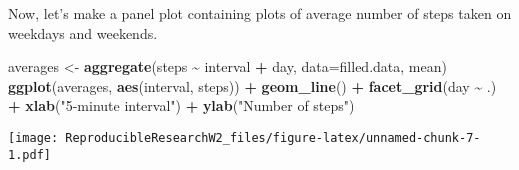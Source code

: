 \documentclass[
]{article}
\newenvironment{Shaded}{\begin{snugshade}}{\end{snugshade}}
\newcommand{\AttributeTok}[1]{\textcolor[rgb]{0.13,0.29,0.53}{#1}}
\newcommand{\FunctionTok}[1]{\textcolor[rgb]{0.13,0.29,0.53}{\textbf{#1}}}
\newcommand{\NormalTok}[1]{#1}
\newcommand{\OtherTok}[1]{\textcolor[rgb]{0.56,0.35,0.01}{#1}}
\newcommand{\SpecialCharTok}[1]{\textcolor[rgb]{0.81,0.36,0.00}{\textbf{#1}}}
\newcommand{\StringTok}[1]{\textcolor[rgb]{0.31,0.60,0.02}{#1}}
\begin{document}
Now, let's make a panel plot containing plots of average number of steps
taken on weekdays and weekends.

\begin{Shaded}
\begin{Highlighting}[]
\NormalTok{averages }\OtherTok{\textless{}{-}} \FunctionTok{aggregate}\NormalTok{(steps }\SpecialCharTok{\textasciitilde{}}\NormalTok{ interval }\SpecialCharTok{+}\NormalTok{ day, }\AttributeTok{data=}\NormalTok{filled.data, mean)}
\FunctionTok{ggplot}\NormalTok{(averages, }\FunctionTok{aes}\NormalTok{(interval, steps)) }\SpecialCharTok{+} \FunctionTok{geom\_line}\NormalTok{() }\SpecialCharTok{+} \FunctionTok{facet\_grid}\NormalTok{(day }\SpecialCharTok{\textasciitilde{}}\NormalTok{ .) }\SpecialCharTok{+}
    \FunctionTok{xlab}\NormalTok{(}\StringTok{"5{-}minute interval"}\NormalTok{) }\SpecialCharTok{+} \FunctionTok{ylab}\NormalTok{(}\StringTok{"Number of steps"}\NormalTok{)}
\end{Highlighting}
\end{Shaded}

\texttt{[image: ReproducibleResearchW2\_files/figure-latex/unnamed-chunk-7-1.pdf]}
\end{document}
